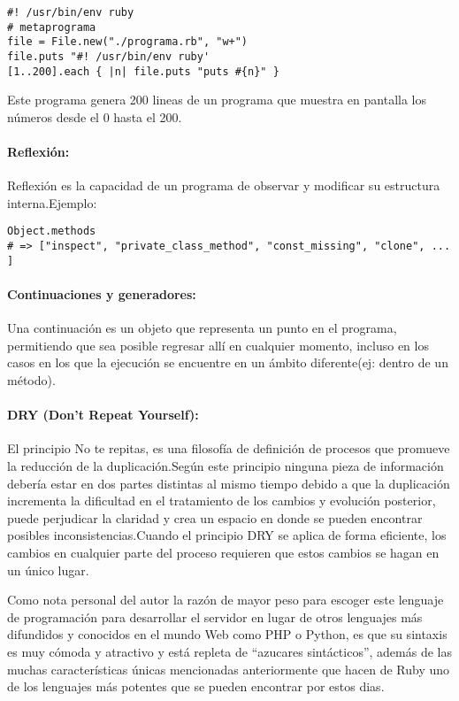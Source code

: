 \begin{verbatim}
#! /usr/bin/env ruby
# metaprograma
file = File.new("./programa.rb", "w+")
file.puts "#! /usr/bin/env ruby'
[1..200].each { |n| file.puts "puts #{n}" }
\end{verbatim}

Este programa genera 200 lineas de un programa que muestra en pantalla los números desde el 0 hasta el 200.

\paragraph{Reflexión:}
Reflexión es la capacidad de un programa de observar y modificar su estructura interna.\newline Ejemplo:

\begin{verbatim}
Object.methods
# => ["inspect", "private_class_method", "const_missing", "clone", ... ]
\end{verbatim}

\paragraph{Continuaciones y generadores:}
Una continuación es un objeto que representa un punto en el programa, permitiendo que sea posible regresar allí en cualquier momento, incluso en los casos en los que la ejecución se encuentre en un ámbito diferente(ej: dentro de un método).

\paragraph{DRY (Don't Repeat Yourself):}
El principio No te repitas, es una filosofía de definición de procesos que promueve la reducción de la duplicación.\newline Según este principio ninguna pieza de información debería estar en dos partes distintas al mismo tiempo debido a que la duplicación incrementa la dificultad en el tratamiento de los cambios y evolución posterior, puede perjudicar la claridad y crea un espacio en donde se pueden encontrar posibles inconsistencias.\newline Cuando el principio DRY se aplica de forma eficiente, los cambios en cualquier parte del proceso requieren que estos cambios se hagan en un único lugar.

Como nota personal del autor la razón de mayor peso para escoger este lenguaje de programación para desarrollar el servidor en lugar de otros lenguajes más difundidos y conocidos en el mundo Web como PHP o Python, es que su sintaxis es muy cómoda y atractivo y está repleta de ``azucares sintácticos'', además de las muchas características únicas mencionadas anteriormente que hacen de Ruby uno de los lenguajes más potentes que se pueden encontrar por estos dias.


